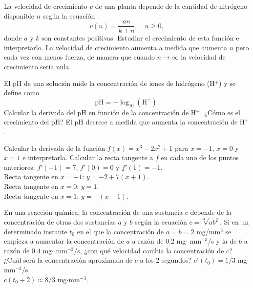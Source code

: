 {La velocidad de crecimiento $v$ de una planta depende de la cantidad de nitrógeno disponible $n$ según la ecuación
\[
v(n) = \frac{an}{k+n},	\quad n\geq 0,
\]
donde $a$ y $k$ son constantes positivas.
Estudiar el crecimiento de esta función e interpretarlo.
}
{La velocidad de crecimiento aumenta a medida que aumenta $n$ pero cada vez con menos fuerza, de manera que cuando $n\rightarrow \infty$ la
velocidad de crecimiento sería nula. }
{
}


{El pH de una solución mide la concentración de iones de hidrógeno (H$^+$) y se define como
\[
\mbox{pH} = -\log_{10}(\mbox{H}^+).
\]
Calcular la derivada del pH en función de la concentración de H$^+$.
¿Cómo es el crecimiento del pH?
}
{El pH decrece a medida que aumenta la concentración de H$^+$.
}
{
}


{Calcular la derivada de la función $f(x)=x^3-2x^2+1$ para $x=-1$, $x=0$ y $x=1$ e interpretarla.
Calcular la recta tangente a $f$ en cada uno de los puntos anteriores.
}
{$f'(-1)=7$, $f'(0)=0$ y $f'(1)=-1$.\\
Recta tangente en $x=-1$: $y=-2+7(x+1)$.\\
Recta tangente en $x=0$: $y=1$.\\
Recta tangente en $x=1$: $y=-(x-1)$.
}
{
}

{
En una reacción química, la concentración de una sustancia $c$ depende de la concentración de otras dos sustancias $a$ y $b$
según la ecuación $c=\sqrt[3]{ab^2}$.
Si en un determinado instante $t_0$ en el que la concentración de $a=b=2$ mg/mm$^3$ se empieza a aumentar la concentración de $a$ a razón de $0.2$ mg$\cdot$ mm$^{-3}$/s y la de $b$ a razón de $0.4$ mg$\cdot$ mm$^{-3}$/s, ¿con qué velocidad cambia la concentración de $c$?
¿Cuál será la concentración aproximada de $c$ a los 2 segundos?
}
{$c'(t_0)=1/3$ mg$\cdot$mm$^{-3}$/s.\\
$c(t_0+2)\approx 8/3$  mg$\cdot$mm$^{-3}$.
}
{
}
